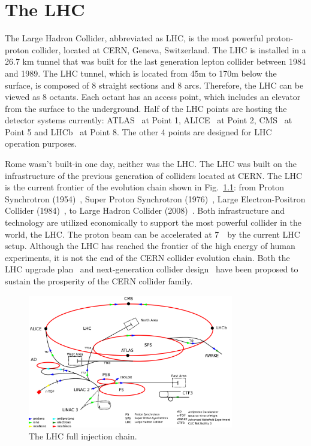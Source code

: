 \chapter{The LHC}
\label{ch:lhc}
\par The Large Hadron Collider, abbreviated as LHC, is the most powerful proton-proton collider, located at CERN, Geneva, Switzerland. The LHC is installed in a 26.7 km tunnel that was built for the last generation lepton collider between 1984 and 1989. The LHC tunnel, which is located from 45m to 170m below the surface, is composed of 8 straight sections and 8 arcs. Therefore, the LHC can be viewed as 8 octants. Each octant has an access point, which includes an elevator from the surface to the underground. Half of the LHC points are hosting the detector systems currently: ATLAS~\cite{Aad:2008zzm} at Point 1, ALICE~\cite{Aamodt:2008zz} at Point 2, CMS~\cite{Chatrchyan:2008aa} at Point 5 and LHCb~\cite{Alves:2008zz} at Point 8. The other 4 points are designed for LHC operation purposes.

\par Rome wasn't built-in one day, neither was the LHC. The LHC was built on the infrastructure of the previous generation of colliders located at CERN. The LHC is the current frontier of the evolution chain shown in Fig.~\ref{fig:c3cernaccs}: from Proton Synchrotron (1954)~\cite{Gilardoni:2011za}, Super Proton Synchrotron (1976)~\cite{Doble:2017syb}, Large Electron-Positron Collider (1984)~\cite{LepInjectorStudy:1983aa,LepInjectorStudy:1983ab}, to Large Hadron Collider (2008)~\cite{Bruning:2004ej,Buning:2004wk}. Both infrastructure and technology are utilized economically to support the most powerful collider in the world, the LHC. The proton beam can be accelerated at 7~\TeV~by the current LHC setup. Although the LHC has reached the frontier of the high energy of human experiments, it is not the end of the CERN collider evolution chain. Both the LHC upgrade plan~\cite{ApollinariG.:2017ojx} and next-generation collider design~\cite{Benedikt:2018csr} have been proposed to sustain the prosperity of the CERN collider family.

\begin{figure}[htbp]
    \centering
    \includegraphics[width=0.8\textwidth]{chapters/c3/figures/cern-accelerator-complex.png}
    \caption{The LHC full injection chain.}
    \label{fig:c3cernaccs}
\end{figure}

